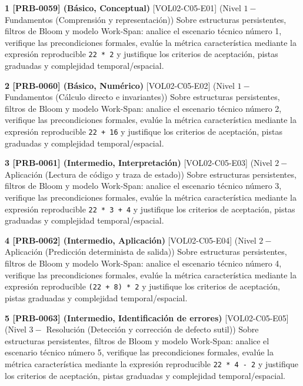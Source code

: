 \documentclass{book}
\begin{document}
\begin{tcolorbox}[title={Ejercicios}, studiumworked, breakable]

\noindent\textbf{1 [PRB-0059] (Básico, Conceptual)}
[VOL02-C05-E01] (Nivel \(1 -\) Fundamentos (Comprensión y representación)) Sobre estructuras persistentes, filtros de Bloom y modelo Work-Span: analice el escenario técnico número 1, verifique las precondiciones formales, evalúe la métrica característica mediante la expresión reproducible \texttt{22 * 2} y justifique los criterios de aceptación, pistas graduadas y complejidad temporal/espacial.

\noindent\textbf{2 [PRB-0060] (Básico, Numérico)}
[VOL02-C05-E02] (Nivel \(1 -\) Fundamentos (Cálculo directo e invariantes)) Sobre estructuras persistentes, filtros de Bloom y modelo Work-Span: analice el escenario técnico número 2, verifique las precondiciones formales, evalúe la métrica característica mediante la expresión reproducible \texttt{22 + 16} y justifique los criterios de aceptación, pistas graduadas y complejidad temporal/espacial.

\noindent\textbf{3 [PRB-0061] (Intermedio, Interpretación)}
[VOL02-C05-E03] (Nivel \(2 -\) Aplicación (Lectura de código y traza de estado)) Sobre estructuras persistentes, filtros de Bloom y modelo Work-Span: analice el escenario técnico número 3, verifique las precondiciones formales, evalúe la métrica característica mediante la expresión reproducible \texttt{22 * 3 + 4} y justifique los criterios de aceptación, pistas graduadas y complejidad temporal/espacial.

\noindent\textbf{4 [PRB-0062] (Intermedio, Aplicación)}
[VOL02-C05-E04] (Nivel \(2 -\) Aplicación (Predicción determinista de salida)) Sobre estructuras persistentes, filtros de Bloom y modelo Work-Span: analice el escenario técnico número 4, verifique las precondiciones formales, evalúe la métrica característica mediante la expresión reproducible \texttt{(22 + 8) * 2} y justifique los criterios de aceptación, pistas graduadas y complejidad temporal/espacial.

\noindent\textbf{5 [PRB-0063] (Intermedio, Identificación de errores)}
[VOL02-C05-E05] (Nivel \(3 -\) Resolución (Detección y corrección de defecto sutil)) Sobre estructuras persistentes, filtros de Bloom y modelo Work-Span: analice el escenario técnico número 5, verifique las precondiciones formales, evalúe la métrica característica mediante la expresión reproducible \texttt{22 * 4 - 2} y justifique los criterios de aceptación, pistas graduadas y complejidad temporal/espacial.


\end{tcolorbox}
\end{document}
